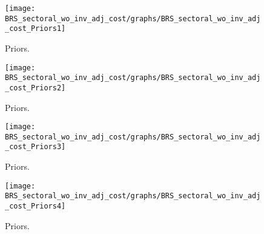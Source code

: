  
\begin{figure}[H]
\centering
\texttt{[image: BRS\_sectoral\_wo\_inv\_adj\_cost/graphs/BRS\_sectoral\_wo\_inv\_adj\_cost\_Priors1]}
\caption{Priors.}\label{Fig:Priors:1}
\end{figure}
\begin{figure}[H]
\centering
\texttt{[image: BRS\_sectoral\_wo\_inv\_adj\_cost/graphs/BRS\_sectoral\_wo\_inv\_adj\_cost\_Priors2]}
\caption{Priors.}\label{Fig:Priors:2}
\end{figure}
\begin{figure}[H]
\centering
\texttt{[image: BRS\_sectoral\_wo\_inv\_adj\_cost/graphs/BRS\_sectoral\_wo\_inv\_adj\_cost\_Priors3]}
\caption{Priors.}\label{Fig:Priors:3}
\end{figure}
\begin{figure}[H]
\centering
\texttt{[image: BRS\_sectoral\_wo\_inv\_adj\_cost/graphs/BRS\_sectoral\_wo\_inv\_adj\_cost\_Priors4]}
\caption{Priors.}\label{Fig:Priors:4}
\end{figure}
 
